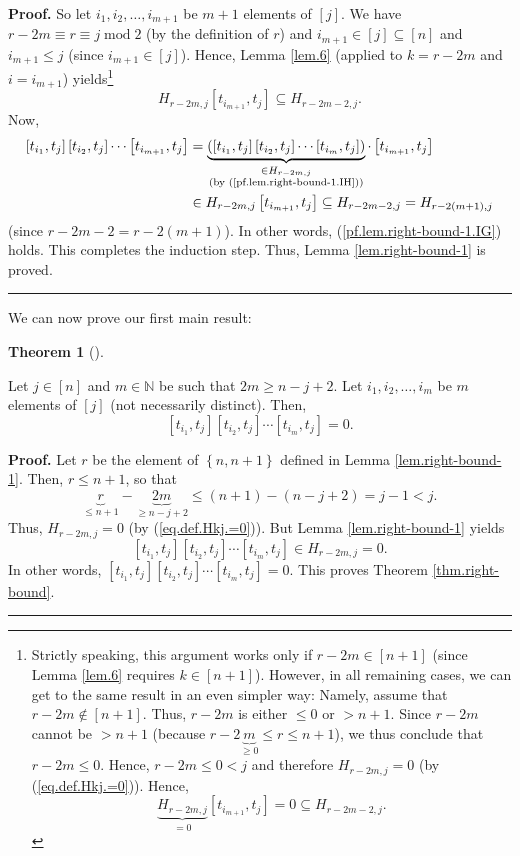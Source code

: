 \documentclass[numbers=enddot,12pt,final,onecolumn,notitlepage]{scrartcl}%
\theoremstyle{definition}
\newtheorem{theo}{Theorem}[section]
\newenvironment{theorem}[1][]
{\begin{theo}[#1]\begin{leftbar}}
{\end{leftbar}\end{theo}}
\newenvironment{proof}[1][Proof]{\noindent\textbf{#1.} }{\ \rule{0.5em}{0.5em}}
\begin{document}
\begin{proof}
So let $i_{1},i_{2},\ldots,i_{m+1}$ be $m+1$ elements of $\left[  j\right]  $.
We have $r-2m\equiv r\equiv j\operatorname{mod}2$ (by the definition of $r$)
and $i_{m+1}\in\left[  j\right]  \subseteq\left[  n\right]  $ and $i_{m+1}\leq
j$ (since $i_{m+1}\in\left[  j\right]  $). Hence, Lemma \ref{lem.6} (applied
to $k=r-2m$ and $i=i_{m+1}$) yields\footnote{Strictly speaking, this argument
works only if $r-2m\in\left[  n+1\right]  $ (since Lemma \ref{lem.6} requires
$k\in\left[  n+1\right]  $). However, in all remaining cases, we can get to
the same result in an even simpler way: Namely, assume that $r-2m\notin\left[
n+1\right]  $. Thus, $r-2m$ is either $\leq0$ or $>n+1$. Since $r-2m$ cannot
be $>n+1$ (because $r-2\underbrace{m}_{\geq0}\leq r\leq n+1$), we thus
conclude that $r-2m\leq0$. Hence, $r-2m\leq0<j$ and therefore $H_{r-2m,j}=0$
(by (\ref{eq.def.Hkj.=0})). Hence,%
\[
\underbrace{H_{r-2m,j}}_{=0}\left[  t_{i_{m+1}},t_{j}\right]  =0\subseteq
H_{r-2m-2,j}.
\]
}
\[
H_{r-2m,j}\left[  t_{i_{m+1}},t_{j}\right]  \subseteq H_{r-2m-2,j}.
\]
Now,%
\begin{align*}
\left[  t_{i_{1}},t_{j}\right]  \left[  t_{i_{2}},t_{j}\right]  \cdots\left[
t_{i_{m+1}},t_{j}\right]   &  =\underbrace{\left(  \left[  t_{i_{1}}%
,t_{j}\right]  \left[  t_{i_{2}},t_{j}\right]  \cdots\left[  t_{i_{m}}%
,t_{j}\right]  \right)  }_{\substack{\in H_{r-2m,j}\\\text{(by
(\ref{pf.lem.right-bound-1.IH}))}}}\cdot\left[  t_{i_{m+1}},t_{j}\right] \\
&  \in H_{r-2m,j}\left[  t_{i_{m+1}},t_{j}\right]  \subseteq H_{r-2m-2,j}%
=H_{r-2\left(  m+1\right)  ,j}%
\end{align*}
(since $r-2m-2=r-2\left(  m+1\right)  $). In other words,
(\ref{pf.lem.right-bound-1.IG}) holds. This completes the induction step.
Thus, Lemma \ref{lem.right-bound-1} is proved.
\end{proof}

We can now prove our first main result:

\begin{theorem}
\label{thm.right-bound}Let $j\in\left[  n\right]  $ and $m\in\mathbb{N}$ be
such that $2m\geq n-j+2$. Let $i_{1},i_{2},\ldots,i_{m}$ be $m$ elements of
$\left[  j\right]  $ (not necessarily distinct). Then,
\[
\left[  t_{i_{1}},t_{j}\right]  \left[  t_{i_{2}},t_{j}\right]  \cdots\left[
t_{i_{m}},t_{j}\right]  =0.
\]

\end{theorem}

\begin{proof}
Let $r$ be the element of $\left\{  n,n+1\right\}  $ defined in Lemma
\ref{lem.right-bound-1}. Then, $r\leq n+1$, so that%
\[
\underbrace{r}_{\leq n+1}-\underbrace{2m}_{\geq n-j+2}\leq\left(  n+1\right)
-\left(  n-j+2\right)  =j-1<j.
\]
Thus, $H_{r-2m,j}=0$ (by (\ref{eq.def.Hkj.=0})). But Lemma
\ref{lem.right-bound-1} yields%
\[
\left[  t_{i_{1}},t_{j}\right]  \left[  t_{i_{2}},t_{j}\right]  \cdots\left[
t_{i_{m}},t_{j}\right]  \in H_{r-2m,j}=0.
\]
In other words, $\left[  t_{i_{1}},t_{j}\right]  \left[  t_{i_{2}}%
,t_{j}\right]  \cdots\left[  t_{i_{m}},t_{j}\right]  =0$. This proves Theorem
\ref{thm.right-bound}.
\end{proof}
\end{document}
